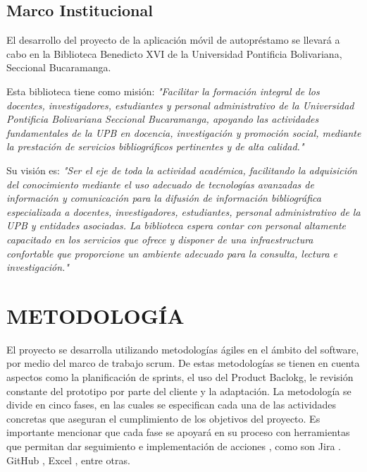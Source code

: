 \documentclass[spanish]{ieee_upb}
\begin{document}
\subsection{Marco Institucional}

El desarrollo del proyecto de la aplicación móvil de autopréstamo se llevará a cabo en la Biblioteca Benedicto XVI de la Universidad Pontificia Bolivariana, Seccional Bucaramanga.
\vspace{0.3 cm}

Esta biblioteca tiene como misión:
\textit{"Facilitar la formación integral de los docentes, investigadores, estudiantes y personal administrativo de la Universidad Pontificia Bolivariana Seccional Bucaramanga, apoyando las actividades fundamentales de la UPB en docencia, investigación y promoción social, mediante la prestación de servicios bibliográficos pertinentes y de alta calidad."}\cite{UPB_Biblioteca}
\vspace{0.3 cm}

Su visión es:
\textit{"Ser el eje de toda la actividad académica, facilitando la adquisición del conocimiento mediante el uso adecuado de tecnologías avanzadas de información y comunicación para la difusión de información bibliográfica especializada a docentes, investigadores, estudiantes, personal administrativo de la UPB y entidades asociadas. La biblioteca espera contar con personal altamente capacitado en los servicios que ofrece y disponer de una infraestructura confortable que proporcione un ambiente adecuado para la consulta, lectura e investigación."} \cite{UPB_Biblioteca}



\newpage
\section{METODOLOGÍA}

El proyecto se desarrolla utilizando metodologías ágiles en el ámbito del software, por medio del marco de trabajo scrum. De estas metodologías se tienen en cuenta aspectos como la planificación de sprints, el uso del Product Baclokg, le revisión constante del prototipo por parte del cliente y la adaptación. La metodología se divide en cinco fases, en las cuales se especifican cada una de las actividades concretas que aseguran el cumplimiento de los objetivos del proyecto.  Es importante mencionar que cada fase se apoyará en su proceso con herramientas que permitan dar seguimiento e implementación de acciones , como son Jira . GitHub , Excel , entre otras.  
 
\end{document}
